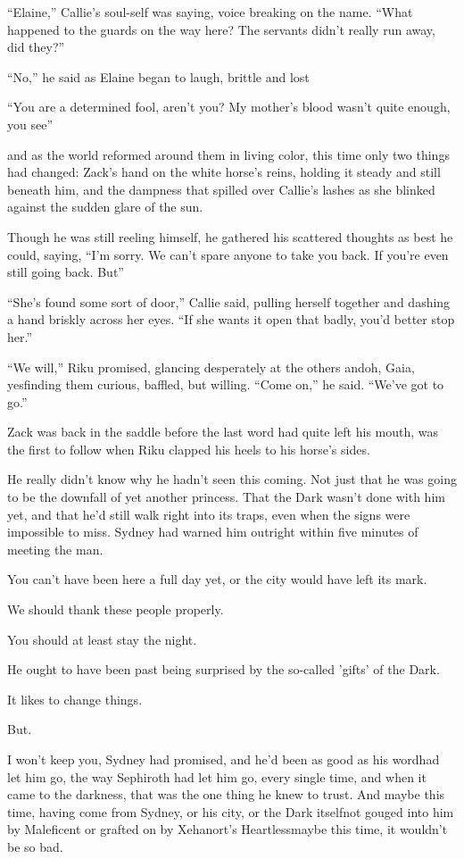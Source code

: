 ``Elaine,'' Callie's soul-self was saying, voice breaking on the name. ``What happened to the guards on the way here? The servants didn't really run away, did they?''

``No,'' he said as Elaine began to laugh, brittle and lost\textemdash 

``You are a determined fool, aren't you? My mother's blood wasn't quite enough, you see\textemdash ''

\textemdash and as the world reformed around them in living color, this time only two things had changed: Zack's hand on the white horse's reins, holding it steady and still beneath him, and the dampness that spilled over Callie's lashes as she blinked against the sudden glare of the sun.

Though he was still reeling himself, he gathered his scattered thoughts as best he could, saying, ``I'm sorry. We can't spare anyone to take you back. If you're even still going back. But\textemdash ''

``She's found some sort of door,'' Callie said, pulling herself together and dashing a hand briskly across her eyes. ``If she wants it open that badly, you'd better stop her.''

``We will,'' Riku promised, glancing desperately at the others and\textemdash oh, Gaia, yes\textemdash finding them curious, baffled, but willing. ``Come on,'' he said. ``We've got to go.''

Zack was back in the saddle before the last word had quite left his mouth, was the first to follow when Riku clapped his heels to his horse's sides.

He really didn't know why he hadn't seen this coming. Not just that he was going to be the downfall of yet another princess. That the Dark wasn't done with him yet, and that he'd still walk right into its traps, even when the signs were impossible to miss. Sydney had warned him outright within five minutes of meeting the man.

You can't have been here a full day yet, or the city would have left its mark.

We should thank these people properly.

You should at least stay the night.

He ought to have been past being surprised by the so-called 'gifts' of the Dark.

It likes to change things.

But.

I won't keep you, Sydney had promised, and he'd been as good as his word\textemdash had let him go, the way Sephiroth had let him go, every single time, and when it came to the darkness, that was the one thing he knew to trust. And maybe this time, having come from Sydney, or his city, or the Dark itself\textemdash not gouged into him by Maleficent or grafted on by Xehanort's Heartless\textemdash maybe this time, it wouldn't be so bad.

